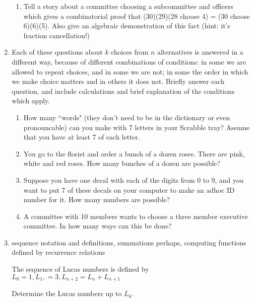 \documentclass[12pt]{article}
\begin{document}
\begin{enumerate}
\begin{enumerate}
\item  Tell a story about a committee choosing a subcommittee and officers which gives a combinatorial proof that \newline (30)(29)(28 choose 4) = (30 choose 6)(6)(5).
Also give an algebraic demonstration of this fact (hint:  it's fraction cancellation!)

\end{enumerate}

\newpage

\item  Each of these questions about $k$ choices from $n$ alternatives is answered in a different way, because of different combinations of conditions:  in some we are allowed to repeat choices, and in some we are not;  in some the order in which we make choice matters and in others it does not.  Briefly answer each question, and include calculations and brief explanation of the conditions which apply.

\begin{enumerate}

\item  How many ``words" (they don't need to be in the dictionary or even pronouncable) can you make with 7 letters in your Scrabble tray?  Assume that you have at least 7 of each letter.

\item  You go to the florist and order a bunch of a dozen roses.  There are pink, white and red roses.  How many bunches of a dozen are possible?

\item   Suppose you have one decal with each of the digits from 0 to 9, and you want to put 7 of these decals on your computer to make an adhoc ID number for it.  How many numbers are possible?

\item   A committee with 10 members wants to choose a three member executive committee.  In how many ways can this be done?

\end{enumerate}

\newpage

\item  sequence notation and definitions, summations perhaps, computing functions defined by recurrence relations

The sequence of Lucas numbers is defined by $L_0 = 1, L_1, = 3, L_{n+2} = L_n + L_{n+1}$

Determine the Lucas numbers up to $L_8$.


\end{enumerate}
\end{document}
